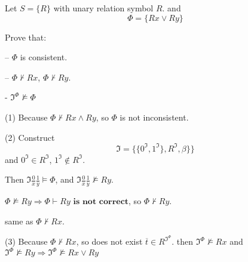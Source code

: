 \documentclass{ximera}
\begin{document}
\begin{problem}
    Let $S = \{R\}$ with unary relation symbol $R$. and
    $$
        \Phi = \{Rx \lor Ry\}
    $$
    
    Prove that:

        – $\Phi$ is consistent.

        – $\Phi \not\vdash Rx$, $\Phi \not\vdash Ry$.

        - $\mathfrak{I}^{\Phi} \not\models \Phi$
    \begin{solution}
        (1) Because $\Phi \not\vdash Rx \land Ry$, so $\Phi$ is not inconsistent. 

        (2) Construct 
        $$
            \mathfrak{I} = \{\{0^{\mathfrak{I}},1^{\mathfrak{I}}\}, R^{\mathfrak{I}}, \beta\}\}
        $$
        and  $0^{\mathfrak{I}} \in R^{\mathfrak{I}}$, $1^{\mathfrak{I}} \not\in R^{\mathfrak{I}}$.

        Then $\mathfrak{I}\frac 0 x \frac 1 y \models \Phi$, and $\mathfrak{I}\frac 0 x \frac 1 y \not\models Ry$.

        $\Phi \not\models Ry \Rightarrow \Phi \vdash Ry \textbf{ is not correct}$, so $\Phi \not\vdash Ry$.

        same as $\Phi \not\vdash Rx$.

        (3) Because $\Phi \not\vdash Rx$, so does not exist $\overline{t} \in R^{\mathfrak{I}^{\Phi}}$.
        then $\mathfrak{I}^{\Phi} \not\models Rx$ and 
        $\mathfrak{I}^{\Phi} \not\models Ry \Rightarrow \mathfrak{I}^{\Phi} \not\models Rx \lor Ry$
        
    \end{solution}
\end{problem}
\end{document}
